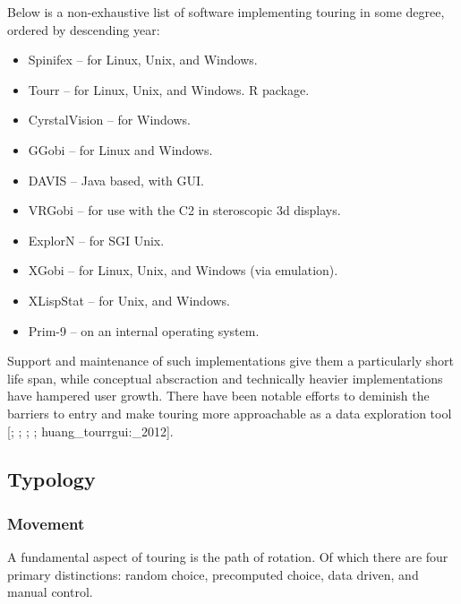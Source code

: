 \documentclass{monashthesis}
\begin{document}
Below is a non-exhaustive list of software implementing touring in some
degree, ordered by descending year:

\begin{itemize}
\tightlist
\item
  Spinifex \autocite{spinifex} -- for Linux, Unix, and Windows.
\item
  Tourr \autocite{wickham_tourr_2011} -- for Linux, Unix, and Windows. R
  package.
\item
  CyrstalVision \autocite{wegman_visual_2003} -- for Windows.
\item
  GGobi \autocite{swayne_ggobi:_2003} -- for Linux and Windows.
\item
  DAVIS \autocite{huh_davis:_2002} -- Java based, with GUI.
\item
  VRGobi \autocite{nelson_xgobi_1998} -- for use with the C2 in
  steroscopic 3d displays.
\item
  ExplorN \autocite{carr_explorn:_1996} -- for SGI Unix.
\item
  XGobi \autocite{swayne_xgobi:_1991} -- for Linux, Unix, and Windows
  (via emulation).
\item
  XLispStat \autocite{tierney_lisp-stat:_1990} -- for Unix, and Windows.
\item
  Prim-9 \autocites{asimov_grand_1985}{fisherkeller_prim-9:_1974} -- on
  an internal operating system.
\end{itemize}

Support and maintenance of such implementations give them a particularly
short life span, while conceptual abscraction and technically heavier
implementations have hampered user growth. There have been notable
efforts to deminish the barriers to entry and make touring more
approachable as a data exploration tool {[}\textcite{huh_davis:_2002};
\textcite{swayne_ggobi:_2003}; \textcite{wegman_visual_2003};
\textcite{wickham_tourr_2011}; huang\_tourrgui:\_2012{]}.

\subsection{Typology}\label{typology}

\subsubsection{Movement}\label{movement}

A fundamental aspect of touring is the path of rotation. Of which there
are four primary distinctions\autocite{buja_computational_2005}: random
choice, precomputed choice, data driven, and manual control.
\end{document}
